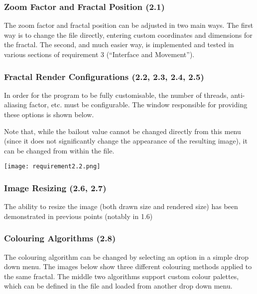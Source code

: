 \subsubsection{Zoom Factor and Fractal Position (2.1)}

The zoom factor and fractal position can be adjusted in two main ways. The first way is to change the  file directly, entering custom coordinates and dimensions for the fractal. The second, and much easier way, is implemented and tested in various sections of requirement 3 (``Interface and Movement'').

\subsubsection{Fractal Render Configurations (2.2, 2.3, 2.4, 2.5)}

In order for the program to be fully customisable, the number of threads, anti-aliasing factor, etc. must be configurable. The window responsible for providing these options is shown below.

Note that, while the bailout value cannot be changed directly from this menu (since it does not significantly change the appearance of the resulting image), it can be changed from within the  file.

\FloatBarrier
\begin{figure*}[htp]
	\centering
	\texttt{[image: requirement2.2.png]}
\end{figure*}
\FloatBarrier

\subsubsection{Image Resizing (2.6, 2.7)}

The ability to resize the image (both drawn size and rendered size) has been demonstrated in previous points (notably in 1.6)

\subsubsection{Colouring Algorithms (2.8)}

The colouring algorithm can be changed by selecting an option in a simple drop down menu. The images below show three different colouring methods applied to the same fractal. The middle two algorithms support custom colour palettes, which can be defined in the  file and loaded from another drop down menu.

